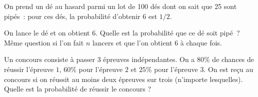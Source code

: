 \documentclass{magnolia}
\begin{document}
On prend un dé au hasard parmi un lot de 100 dés dont on sait que 25
sont pipés~: pour ces dés, la probabilité d'obtenir $6$ est $1/2$.
\begin{questions}
\question On lance le dé et on obtient $6$.
  Quelle est la probabilité que ce dé soit pipé~?
\question Même question si l'on fait $n$ lancers et que l'on obtient
  $6$ à chaque fois.
\end{questions}


Un concours consiste à passer 3 épreuves indépendantes. On a $80 \%$ de chances de réussir
l'épreuve $1$, $60\%$ pour l'épreuve $2$ et $25\%$ pour l'épreuve $3$. On est reçu au
concours si on réussit au moins deux épreuves sur trois (n'importe lesquelles). Quelle est
la probabilité de réussir le concours ?

\end{document}

